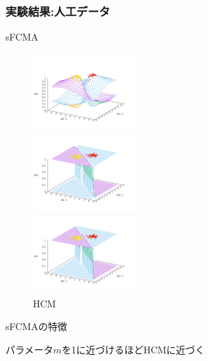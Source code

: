\documentclass[13pt,dvipdfmx]{beamer}
\begin{document}
\begin{frame}\frametitle{実験結果:人工データ}
  \begin{block}{sFCMA}
    \begin{figure}[htbp]
      \begin{minipage}{0.32\hsize}
        \begin{center}
          \includegraphics[width=40mm]{sFCMA-Em2.png}
        \end{center}
        \captionsetup{labelformat=empty,labelsep=none}
        \caption{$m=2$}
        \label{fig:one}
      \end{minipage}
      \begin{minipage}{0.32\hsize}
        \begin{center}
          \includegraphics[width=40mm]{sFCMA-Em11.png}
        \end{center}
        \captionsetup{labelformat=empty,labelsep=none}
        \caption{$m=1.01$}
        \label{fig:two}
      \end{minipage}
     \begin{minipage}{0.32\hsize}
        \begin{center}
          \includegraphics[width=40mm]{HCM.png}
        \end{center}
        \captionsetup{labelformat=empty,labelsep=none}
        \caption{HCM}
        \label{fig:three}
     \end{minipage}
    \end{figure}
  \end{block}
  \begin{block}{sFCMAの特徴}
    \begin{center}
      パラメータ$m$を1に近づけるほどHCMに近づく
    \end{center}
  \end{block}
\end{frame}
\end{document}
